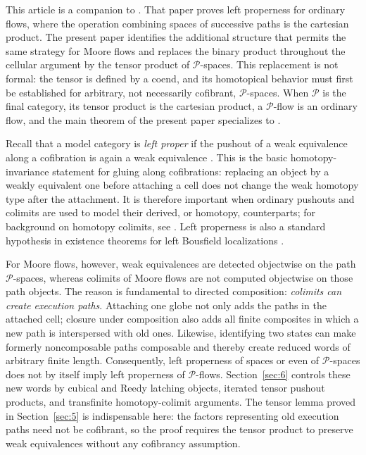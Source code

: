 \documentclass[12pt,a4paper]{amsart}
\newcommand{\Pcat}{\mathcal P}
\theoremstyle{definition}
\begin{document}
This article is a companion to \cite{leftproperflow}. That paper proves left properness for ordinary flows, where the operation combining spaces of successive paths is the cartesian product. The present paper identifies the additional structure that permits the same strategy for Moore flows and replaces the binary product throughout the cellular argument by the tensor product of \(\Pcat\)-spaces. This replacement is not formal: the tensor is defined by a coend, and its homotopical behavior must first be established for arbitrary, not necessarily cofibrant, \(\Pcat\)-spaces. When \(\Pcat\) is the final category, its tensor product is the cartesian product, a \(\Pcat\)-flow is an ordinary flow, and the main theorem of the present paper specializes to \cite[Theorem~5.6]{leftproperflow}.

Recall that a model category is \emph{left proper} if the pushout of a weak equivalence along a cofibration is again a weak equivalence \cite[Section~1.1]{MR99h:55031}. This is the basic homotopy-invariance statement for gluing along cofibrations: replacing an object by a weakly equivalent one before attaching a cell does not change the weak homotopy type after the attachment. It is therefore important when ordinary pushouts and colimits are used to model their derived, or homotopy, counterparts; for background on homotopy colimits, see \cite[Chapters~5--6]{Riehl}. Left properness is also a standard hypothesis in existence theorems for left Bousfield localizations \cite[Chapter~4]{ref_model2}.

For Moore flows, however, weak equivalences are detected objectwise on the path \(\Pcat\)-spaces, whereas colimits of Moore flows are not computed objectwise on those path objects. The reason is fundamental to directed composition: \emph{colimits can create execution paths}. Attaching one globe not only adds the paths in the attached cell; closure under composition also adds all finite composites in which a new path is interspersed with old ones. Likewise, identifying two states can make formerly noncomposable paths composable and thereby create reduced words of arbitrary finite length. Consequently, left properness of spaces or even of \(\Pcat\)-spaces does not by itself imply left properness of \(\Pcat\)-flows. Section~\ref{sec:6} controls these new words by cubical and Reedy latching objects, iterated tensor pushout products, and transfinite homotopy-colimit arguments. The tensor lemma proved in Section~\ref{sec:5} is indispensable here: the factors representing old execution paths need not be cofibrant, so the proof requires the tensor product to preserve weak equivalences without any cofibrancy assumption.
\end{document}
